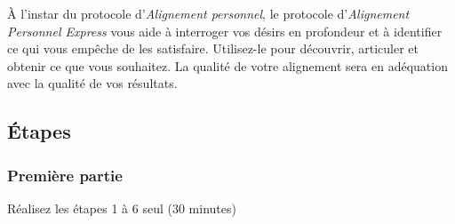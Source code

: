 \documentclass[paper=6in:9in,pagesize=pdftex,headinclude=on,footinclude=on,11pt]{scrbook}
\begin{document}
À l'instar du protocole d'\emph{Alignement personnel}, le protocole d'\emph{Alignement Personnel Express} vous aide à interroger vos désirs en profondeur
et à identifier ce qui vous empêche de les satisfaire. Utilisez-le pour découvrir, articuler et obtenir ce que vous souhaitez. La qualité de votre
alignement sera en adéquation avec la qualité de vos résultats.

\subsection{Étapes}

\subsubsection{Première partie}
Réalisez les étapes 1 à 6 seul (30 minutes)
\end{document}
